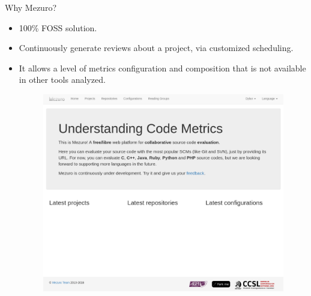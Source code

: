 \begin{block}{Why Mezuro?}
    \begin{itemize}
        \item 100\% FOSS solution.

        \item Continuously generate reviews about a project, via customized
            scheduling.

        \item It allows a level of metrics configuration and composition that
            is not available in other tools analyzed.

        \begin{figure}
            \begin{center}
                \includegraphics[scale=0.8]{figures/MezuroHome2.png}
                \label{fig:feature1}
            \end{center}
        \end{figure}

    \end{itemize}
\end{block}

